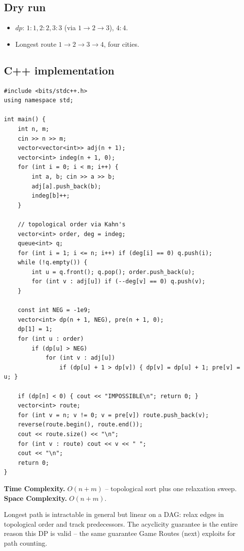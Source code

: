 \subsection*{Dry run}


\begin{itemize}
  \item $\textit{dp}$: $1{:}1,2{:}2,3{:}3$ (via $1\!\to\!2\!\to\!3$),
        $4{:}4$.
  \item Longest route $1\to2\to3\to4$, four cities.
\end{itemize}

\subsection*{C++ implementation}

\begin{lstlisting}
#include <bits/stdc++.h>
using namespace std;

int main() {
    int n, m;
    cin >> n >> m;
    vector<vector<int>> adj(n + 1);
    vector<int> indeg(n + 1, 0);
    for (int i = 0; i < m; i++) {
        int a, b; cin >> a >> b;
        adj[a].push_back(b);
        indeg[b]++;
    }

    // topological order via Kahn's
    vector<int> order, deg = indeg;
    queue<int> q;
    for (int i = 1; i <= n; i++) if (deg[i] == 0) q.push(i);
    while (!q.empty()) {
        int u = q.front(); q.pop(); order.push_back(u);
        for (int v : adj[u]) if (--deg[v] == 0) q.push(v);
    }

    const int NEG = -1e9;
    vector<int> dp(n + 1, NEG), pre(n + 1, 0);
    dp[1] = 1;
    for (int u : order)
        if (dp[u] > NEG)
            for (int v : adj[u])
                if (dp[u] + 1 > dp[v]) { dp[v] = dp[u] + 1; pre[v] = u; }

    if (dp[n] < 0) { cout << "IMPOSSIBLE\n"; return 0; }
    vector<int> route;
    for (int v = n; v != 0; v = pre[v]) route.push_back(v);
    reverse(route.begin(), route.end());
    cout << route.size() << "\n";
    for (int v : route) cout << v << " ";
    cout << "\n";
    return 0;
}
\end{lstlisting}

\begin{complexitybox}
\textbf{Time Complexity.} $O(n+m)$ -- topological sort plus one relaxation
sweep. \textbf{Space Complexity.} $O(n+m)$.
\end{complexitybox}

\begin{takeawaybox}
Longest path is intractable in general but linear on a DAG: relax edges in
topological order and track predecessors. The acyclicity guarantee is the
entire reason this DP is valid -- the same guarantee Game Routes (next)
exploits for path counting.
\end{takeawaybox}
